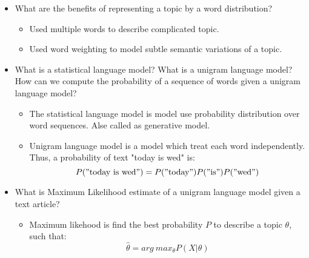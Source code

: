 \documentclass[11pt]{article}
\providecommand{\tightlist}{%
      \setlength{\itemsep}{0pt}\setlength{\parskip}{0pt}}
\begin{document}
    \begin{itemize}
\tightlist
\item
  What are the benefits of representing a topic by a word distribution?

  \begin{itemize}
  \tightlist
  \item
    Used multiple words to describe complicated topic.
  \item
    Used word weighting to model subtle semantic variations of a topic. 
  \end{itemize}
\end{itemize}

    \begin{itemize}
\tightlist
\item
  What is a statistical language model? What is a unigram language
  model? How can we compute the probability of a sequence of words given
  a unigram language model?

  \begin{itemize}
  \tightlist
  \item
    The statistical language model is model use probability distribution
    over word sequences. Alse called as generative model.
  \item
    Unigram language model is a model which treat each word
    independently. Thus, a probability of text "today is wed" is:
    \[P("\text{today is wed}") = P("\text{today}")P("\text{is}")P("\text{wed}")\]
  \end{itemize}
\end{itemize}

    \begin{itemize}
\tightlist
\item
  What is Maximum Likelihood estimate of a unigram language model given
  a text article?

  \begin{itemize}
  \tightlist
  \item
    Maximum likehood is find the best probability \(P\) to describe a
    topic \(\theta\), such that:
    \[\hat{\theta} = arg \ max_{\theta} P(X|\theta)\] 
  \end{itemize}
\end{itemize}
\end{document}
